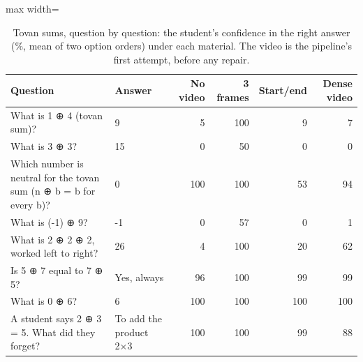 \begin{table}[!tbp]\centering\footnotesize
\caption{Tovan sums, question by question: the student's confidence in the right answer (\%, mean of two option orders) under each material. The video is the pipeline's first attempt, before any repair.}\label{tab:novel_items}
\begin{adjustbox}{max width=\linewidth}\begin{tabular}{p{6.4cm}p{2.4cm}rrrr}\toprule Question & Answer & No video & 3 frames & Start/end & Dense video\\\midrule
What is 1 ⊕ 4 (tovan sum)? & 9 & 5 & 100 & 9 & 7 \\
What is 3 ⊕ 3? & 15 & 0 & 50 & 0 & 0 \\
Which number is neutral for the tovan sum (n ⊕ b = b for every b)? & 0 & 100 & 100 & 53 & 94 \\
What is (-1) ⊕ 9? & -1 & 0 & 57 & 0 & 1 \\
What is 2 ⊕ 2 ⊕ 2, worked left to right? & 26 & 4 & 100 & 20 & 62 \\
Is 5 ⊕ 7 equal to 7 ⊕ 5? & Yes, always & 96 & 100 & 99 & 99 \\
What is 0 ⊕ 6? & 6 & 100 & 100 & 100 & 100 \\
A student says 2 ⊕ 3 = 5. What did they forget? & To add the product 2×3 & 100 & 100 & 99 & 88 \\
\bottomrule\end{tabular}\end{adjustbox}
\end{table}
